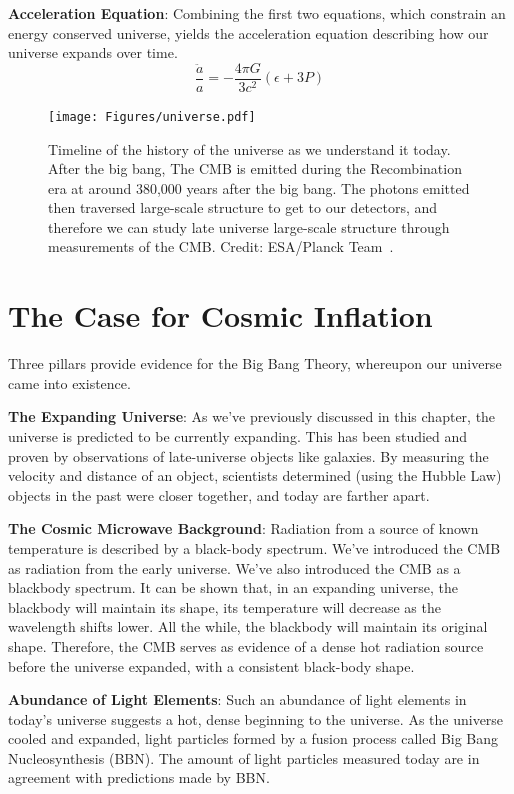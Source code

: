 \noindent
\textbf{Acceleration Equation}: Combining the first two equations, which constrain an energy conserved universe, yields the acceleration equation describing how our universe expands over time.  
\begin{equation}
    \frac{\ddot{a}}{a} = - \frac{4\pi G}{3 c^2} (\epsilon + 3 P)
\end{equation}

\begin{figure}
    \centering
    \texttt{[image: Figures/universe.pdf]}
    \caption{Timeline of the history of the universe as we understand it today.  After the big bang, The CMB is emitted during the Recombination era at around 380,000 years after the big bang.  The photons emitted then traversed large-scale structure to get to our detectors, and therefore we can study late universe large-scale structure through measurements of the CMB.  Credit: ESA/Planck Team~\cite{NASApic}.}
    \label{fig:universe_timeline}
\end{figure}
\section{The Case for Cosmic Inflation}
Three pillars provide evidence for the Big Bang Theory, whereupon our universe came into existence.

\noindent
\textbf{The Expanding Universe}: As we've previously discussed in this chapter, the universe is predicted to be currently expanding.  This has been studied and proven by observations of late-universe objects like galaxies.  By measuring the velocity and distance of an object, scientists determined (using the Hubble Law) objects in the past were closer together, and today are farther apart.  

\noindent
\textbf{The Cosmic Microwave Background}:
Radiation from a source of known temperature is described by a black-body spectrum.  We've introduced the CMB as radiation from the early universe.  We've also introduced the CMB as a blackbody spectrum.  It can be shown that, in an expanding universe, the blackbody will maintain its shape, its temperature will decrease as the wavelength shifts lower.  All the while, the blackbody will maintain its original shape.  Therefore, the CMB serves as evidence of a dense hot radiation source before the universe expanded, with a consistent black-body shape.

\noindent
\textbf{Abundance of Light Elements}:  Such an abundance of light elements in today's universe suggests a hot, dense beginning to the universe.  As the universe cooled and expanded, light particles formed by a fusion process called Big Bang Nucleosynthesis (BBN).  The amount of light particles measured today are in agreement with predictions made by BBN.

